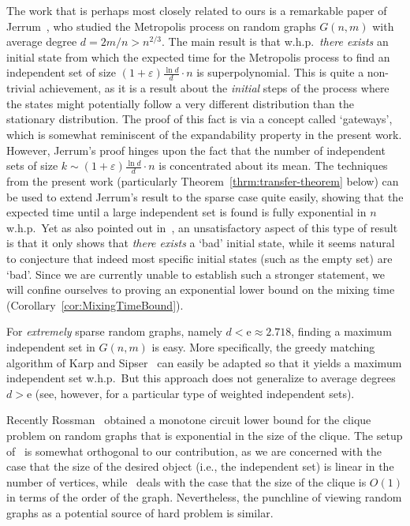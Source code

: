 \documentclass[a4paper,10pt]{article}
\newcommand\eul{\mathrm{e}}
\newcommand\eps{\varepsilon}
\newcommand{\whp}{w.h.p.}
\newcommand\Thm{Theorem}
\newcommand\Cor{Corollary}
\begin{document}
The work that is perhaps most closely related to ours is  a remarkable
paper of Jerrum~\cite{jerrum-planted}, who studied the Metropolis
process on random graphs $G(n,m)$ with average degree $d=2m/n>n^{2/3}$.
The main result is that \whp\  \emph{there exists} an initial
state from which the expected time for the Metropolis process to
find an independent set of size $(1+\eps)\frac{\ln d}d\cdot n$ is
superpolynomial.
This is quite a non-trivial achievement, as it is a result about the
\emph{initial} steps of the process where the states might potentially
follow a very different distribution than the stationary distribution.
The proof of this fact is via a concept called `gateways', which is
somewhat reminiscent of the expandability property in the present work.
However, Jerrum's proof hinges upon the fact that the number of
independent sets of size $k\sim(1+\eps)\frac{\ln d}d\cdot n$ is
concentrated about its mean. The techniques from the present work
(particularly \Thm~\ref{thrm:transfer-theorem} below) can be used
to extend Jerrum's result to the sparse case quite easily, showing
that the expected time until a large independent set is found is fully
exponential in $n$ \whp\ Yet as also pointed out in~\cite{jerrum-planted},
an unsatisfactory aspect of this type of result is that it only shows that
\emph{there exists} a `bad' initial state, 	while it seems natural to
conjecture that indeed most specific initial states (such as the empty set)
are `bad'. Since we are currently unable to establish such a
stronger statement, we will confine ourselves to proving an exponential
lower bound on the mixing time (\Cor~\ref{cor:MixingTimeBound}).



For \emph{extremely} sparse random graphs, namely $d<\eul\approx2.718$,
finding a maximum independent set in $G(n,m)$ is easy. More
specifically, the greedy matching algorithm of Karp and
Sipser~\cite{KarpSipser} can easily be adapted so that it
yields a maximum independent set \whp\ But this approach does
not generalize to average degrees $d>\eul$ (see, however,
\cite{Gamarnik} for a particular type of weighted independent
sets).



Recently Rossman~\cite{monotone-circuit} obtained a monotone circuit
lower bound for the clique problem on random graphs that is exponential
in the size of the clique. The setup of~\cite{monotone-circuit} is
somewhat orthogonal to our contribution, as we are concerned with the
case that the size of the desired object (i.e., the independent set)
is linear in the number of vertices, while~\cite{monotone-circuit}
deals with the case that the size of the clique is $O(1)$ in terms
of the order of the graph. Nevertheless, the punchline of viewing
random graphs as a potential source of hard problem is similar.
\end{document}
